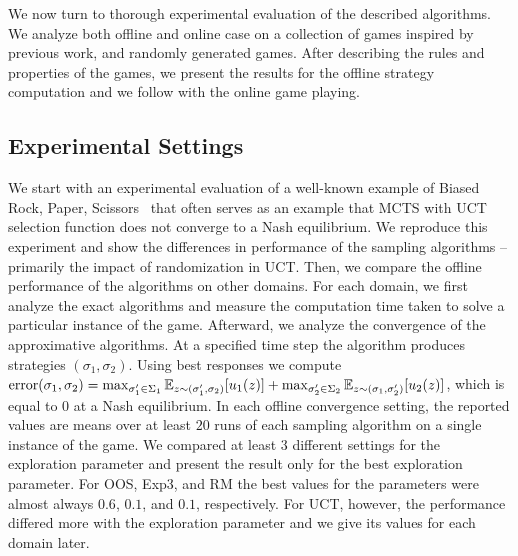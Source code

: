 
We now turn to thorough experimental evaluation of the described algorithms.
We analyze both offline and online case on a collection of games inspired by previous work, and randomly generated games.
After describing the rules and properties of the games, we present the results for the offline strategy computation and we follow with the online game playing.

\subsection{Experimental Settings}

We start with an experimental evaluation of a well-known example of Biased Rock, Paper, Scissors~\cite{Shafiei09} that often serves
as an example that MCTS with UCT selection function does not converge to a Nash equilibrium.
We reproduce this experiment and show the differences in performance of the sampling algorithms -- primarily the impact of randomization in UCT.
Then, we compare the offline performance of the algorithms on other domains.
For each domain, we first analyze the exact algorithms and measure the computation time taken to solve a particular instance of the game.
Afterward, we analyze the convergence of the approximative algorithms.
At a specified time step the algorithm produces strategies $(\sigma_1,\sigma_2)$. Using best responses we compute
$\textrm{error}(\sigma_1,\sigma_2) = \max_{\sigma_1' \in \Sigma_1} \mathbb{E}_{z \sim (\sigma_1',\sigma_2)}[u_1(z)]
                                   + \max_{\sigma_2' \in \Sigma_2} \mathbb{E}_{z \sim (\sigma_1,\sigma_2')}[u_2(z)]$,
which is equal to $0$ at a Nash equilibrium.
In each offline convergence setting, the reported values are means over at least $20$ runs of each sampling algorithm on a single instance of the game.
We compared at least $3$ different settings for the exploration parameter and present the result only for the best exploration parameter.
For OOS, Exp3, and RM the best values for the parameters were almost always $0.6$, $0.1$, and $0.1$, respectively.
For UCT, however, the performance differed more with the exploration parameter and we give its values for each domain later.

